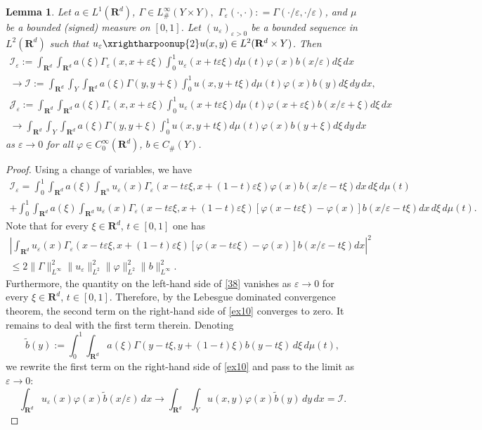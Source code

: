 \documentclass[11pt]{article}
\newcommand\e {\varepsilon}
\newcommand{\R}{\mathbf{R}}
\newtheorem{lemma}[theorem]{Lemma}
\theoremstyle{remark}
\begin{document}
\begin{appendices}
\begin{lemma} \label{twoscalelimit1}
	Let $a \in L^1(\R^d)$, $\Gamma \in L^{\infty}_\#(Y \times Y), $ $\Gamma_\e(\cdot,\cdot): = \Gamma(\cdot/\e,\cdot/\e)$,  and  $\mu$ be a bounded (signed)  measure on $[0,1]$. 	Let  $({u}_\e )_{\e>0}$ be a bounded sequence in $L^2(\R^d)$ such that
	$u_\e  \xrightharpoonup{2} u(x,y)\in L^2(\R^d\times Y)$.
	Then
	\begin{multline}\label{37}
		\mathcal{I}_\e:=	\int_{\R^d} \int_{\R^d} a(\xi)\Gamma_\e({x},{x+\e\xi} )\int_0^1 u_\e (x+t\e \xi) d \mu(t) \varphi(x) b({x}/\e ) d\xi\, dx
		\\
		\to \mathcal{I}:=\int_{\R^d} \int_{Y}\int_{\R^d} a(\xi) \Gamma (y,y+\xi)  \int_0^1 u(x,y+t\xi) d \mu(t) \varphi(x) b(y) d\xi\,dy\,dx,
	\end{multline}
	\begin{multline}\label{38a}
		\mathcal{J}_\e:=	\int_{\R^d} \int_{\R^d} a(\xi)\Gamma_\e({x},{x+\e\xi} )\int_0^1 u_\e (x+t\e \xi) d \mu(t) \varphi(x+\e\xi) b({x/\e+\xi} ) d\xi\, dx
		\\
		\to \int_{\R^d} \int_{Y}\int_{\R^d} a(\xi) \Gamma (y,y+\xi)  \int_0^1 u(x,y+t\xi) d \mu(t) \varphi(x) b(y+\xi) d\xi\,dy\,dx
	\end{multline}
	as $\e\to 0$ for all $\varphi \in C_0^\infty(\R^d)$, $b \in C_\#(Y)$.
\end{lemma} 	
\begin{proof}
	Using a change of variables, we have
	\begin{multline}\label{ex10}
		\mathcal{I}_\e
		=  \int_0^1 \int_{\R^d} a(\xi) \int_{\R^n} u_\e (x) \Gamma_\e({x-t\e\xi} ,{x+(1-t)\e \xi} ) \varphi(x)b(x/\e-t\xi) dx\, d\xi\, d\mu(t) \\ +
		\int_0^1 \int_{\R^d} a(\xi) \int_{\R^d} u_\e (x) \Gamma_\e({x-t\e\xi} ,{x+(1-t)\e \xi} )[\varphi(x-t\e \xi)-\varphi(x)]b(x/\e-t\xi) dx\, d\xi\,d\mu(t). 	
	\end{multline}
	Note that for every $\xi \in \R^d$, $t \in [0,1]$ one has
	\begin{multline}\label{38}
		\left|  \int_{\R^d} u_\e (x) \Gamma_\e({x-t\e\xi} ,{x+(1-t)\e \xi} ) [\varphi(x-t\e \xi)-\varphi(x)]b(x/\e-t\xi) dx \right|^2
		\\
		\leq 2\|\Gamma\|^2_{L^{\infty}}\|u_\e \|^2_{L^2}\|\varphi\|^2_{L^2}\|b\|^2_{L^{\infty}}.
	\end{multline}
	Furthermore, the quantity on the left-hand  side of \eqref{38} vanishes   as $\e\to 0$ for every $\xi \in \R^d$, $t \in [0,1]$. Therefore, by the Lebesgue dominated convergence theorem, the second term on the right-hand  side of \eqref{ex10} converges to zero. It remains to deal with the first term therein. 	Denoting
	$$\tilde{b}(y):= \int_0^1 \int_{\R^d} a(\xi) \Gamma(y-t\xi,y+(1-t)\xi)b(y-t\xi) \,d\xi\,d\mu(t),$$
	we rewrite the first term on the right-hand  side of \eqref{ex10} and pass to the limit as $\e\to 0$:
	\begin{equation}\label{13}
		\int_{\R^d}  u_\e (x) \varphi(x)\tilde{b}(x/\e)\, dx
		\to 	 \int_{\R^d} \int_{Y}u(x,y)\varphi(x)\tilde{b}(y) \,dy\,dx = \mathcal{I}.
	\end{equation}
	

\end{proof}
\end{appendices}
\end{document}
